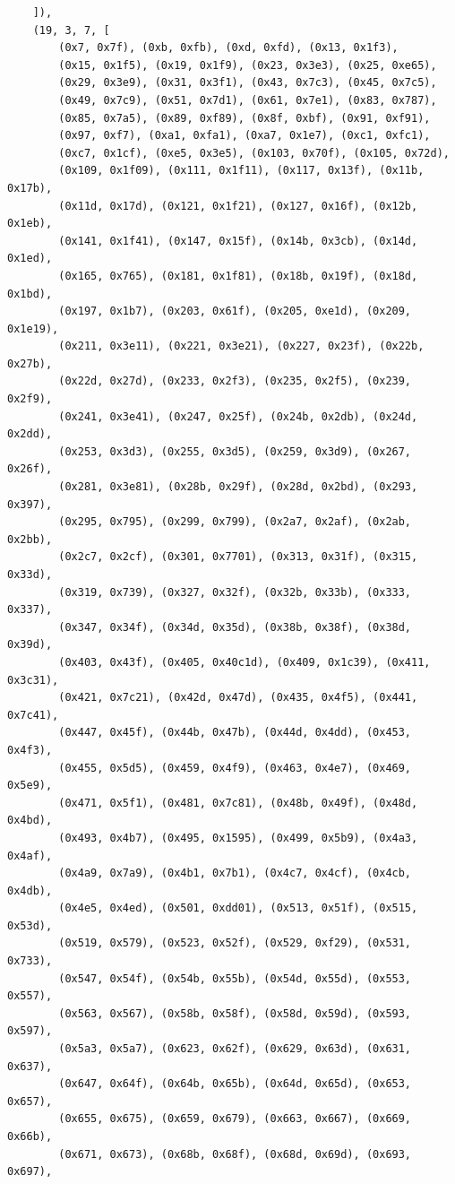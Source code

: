 \documentclass[11pt,a4paper]{article}
\begin{document}
\begin{lstlisting}
    ]),
    (19, 3, 7, [
        (0x7, 0x7f), (0xb, 0xfb), (0xd, 0xfd), (0x13, 0x1f3),
        (0x15, 0x1f5), (0x19, 0x1f9), (0x23, 0x3e3), (0x25, 0xe65),
        (0x29, 0x3e9), (0x31, 0x3f1), (0x43, 0x7c3), (0x45, 0x7c5),
        (0x49, 0x7c9), (0x51, 0x7d1), (0x61, 0x7e1), (0x83, 0x787),
        (0x85, 0x7a5), (0x89, 0xf89), (0x8f, 0xbf), (0x91, 0xf91),
        (0x97, 0xf7), (0xa1, 0xfa1), (0xa7, 0x1e7), (0xc1, 0xfc1),
        (0xc7, 0x1cf), (0xe5, 0x3e5), (0x103, 0x70f), (0x105, 0x72d),
        (0x109, 0x1f09), (0x111, 0x1f11), (0x117, 0x13f), (0x11b, 0x17b),
        (0x11d, 0x17d), (0x121, 0x1f21), (0x127, 0x16f), (0x12b, 0x1eb),
        (0x141, 0x1f41), (0x147, 0x15f), (0x14b, 0x3cb), (0x14d, 0x1ed),
        (0x165, 0x765), (0x181, 0x1f81), (0x18b, 0x19f), (0x18d, 0x1bd),
        (0x197, 0x1b7), (0x203, 0x61f), (0x205, 0xe1d), (0x209, 0x1e19),
        (0x211, 0x3e11), (0x221, 0x3e21), (0x227, 0x23f), (0x22b, 0x27b),
        (0x22d, 0x27d), (0x233, 0x2f3), (0x235, 0x2f5), (0x239, 0x2f9),
        (0x241, 0x3e41), (0x247, 0x25f), (0x24b, 0x2db), (0x24d, 0x2dd),
        (0x253, 0x3d3), (0x255, 0x3d5), (0x259, 0x3d9), (0x267, 0x26f),
        (0x281, 0x3e81), (0x28b, 0x29f), (0x28d, 0x2bd), (0x293, 0x397),
        (0x295, 0x795), (0x299, 0x799), (0x2a7, 0x2af), (0x2ab, 0x2bb),
        (0x2c7, 0x2cf), (0x301, 0x7701), (0x313, 0x31f), (0x315, 0x33d),
        (0x319, 0x739), (0x327, 0x32f), (0x32b, 0x33b), (0x333, 0x337),
        (0x347, 0x34f), (0x34d, 0x35d), (0x38b, 0x38f), (0x38d, 0x39d),
        (0x403, 0x43f), (0x405, 0x40c1d), (0x409, 0x1c39), (0x411, 0x3c31),
        (0x421, 0x7c21), (0x42d, 0x47d), (0x435, 0x4f5), (0x441, 0x7c41),
        (0x447, 0x45f), (0x44b, 0x47b), (0x44d, 0x4dd), (0x453, 0x4f3),
        (0x455, 0x5d5), (0x459, 0x4f9), (0x463, 0x4e7), (0x469, 0x5e9),
        (0x471, 0x5f1), (0x481, 0x7c81), (0x48b, 0x49f), (0x48d, 0x4bd),
        (0x493, 0x4b7), (0x495, 0x1595), (0x499, 0x5b9), (0x4a3, 0x4af),
        (0x4a9, 0x7a9), (0x4b1, 0x7b1), (0x4c7, 0x4cf), (0x4cb, 0x4db),
        (0x4e5, 0x4ed), (0x501, 0xdd01), (0x513, 0x51f), (0x515, 0x53d),
        (0x519, 0x579), (0x523, 0x52f), (0x529, 0xf29), (0x531, 0x733),
        (0x547, 0x54f), (0x54b, 0x55b), (0x54d, 0x55d), (0x553, 0x557),
        (0x563, 0x567), (0x58b, 0x58f), (0x58d, 0x59d), (0x593, 0x597),
        (0x5a3, 0x5a7), (0x623, 0x62f), (0x629, 0x63d), (0x631, 0x637),
        (0x647, 0x64f), (0x64b, 0x65b), (0x64d, 0x65d), (0x653, 0x657),
        (0x655, 0x675), (0x659, 0x679), (0x663, 0x667), (0x669, 0x66b),
        (0x671, 0x673), (0x68b, 0x68f), (0x68d, 0x69d), (0x693, 0x697),

\end{lstlisting}
\end{document}

